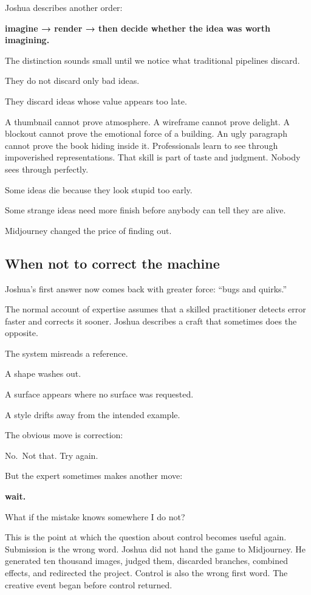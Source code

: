 \documentclass[
]{article}
\begin{document}
Joshua describes another order:

\textbf{imagine → render → then decide whether the idea was worth
imagining.}

The distinction sounds small until we notice what traditional pipelines
discard.

They do not discard only bad ideas.

They discard ideas whose value appears too late.

A thumbnail cannot prove atmosphere. A wireframe cannot prove delight. A
blockout cannot prove the emotional force of a building. An ugly
paragraph cannot prove the book hiding inside it. Professionals learn to
see through impoverished representations. That skill is part of taste
and judgment. Nobody sees through perfectly.

Some ideas die because they look stupid too early.

Some strange ideas need more finish before anybody can tell they are
alive.

Midjourney changed the price of finding out.

\subsection{When not to correct the
machine}\label{when-not-to-correct-the-machine}

Joshua's first answer now comes back with greater force: ``bugs and
quirks.''

The normal account of expertise assumes that a skilled practitioner
detects error faster and corrects it sooner. Joshua describes a craft
that sometimes does the opposite.

The system misreads a reference.

A shape washes out.

A surface appears where no surface was requested.

A style drifts away from the intended example.

The obvious move is correction:

No.~Not that. Try again.

But the expert sometimes makes another move:

\textbf{wait.}

What if the mistake knows somewhere I do not?

This is the point at which the question about control becomes useful
again. Submission is the wrong word. Joshua did not hand the game to
Midjourney. He generated ten thousand images, judged them, discarded
branches, combined effects, and redirected the project. Control is also
the wrong first word. The creative event began before control returned.
\end{document}
